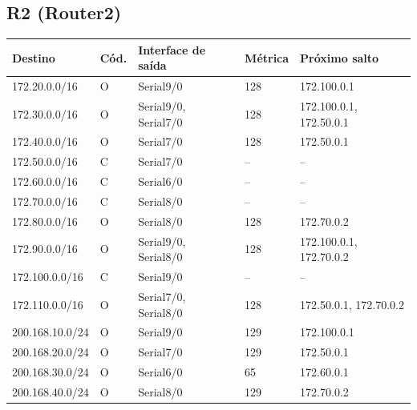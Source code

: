 \subsection*{R2 (Router2)}
\begin{tabular}{@{}llllp{3.6cm}@{}}\toprule Destino & Cód. & Interface de saída & Métrica & Próximo salto\\\midrule
172.20.0.0/16 & O & Serial9/0 & 128 & 172.100.0.1\\
172.30.0.0/16 & O & Serial9/0, Serial7/0 & 128 & 172.100.0.1, 172.50.0.1\\
172.40.0.0/16 & O & Serial7/0 & 128 & 172.50.0.1\\
172.50.0.0/16 & C & Serial7/0 & -- & --\\
172.60.0.0/16 & C & Serial6/0 & -- & --\\
172.70.0.0/16 & C & Serial8/0 & -- & --\\
172.80.0.0/16 & O & Serial8/0 & 128 & 172.70.0.2\\
172.90.0.0/16 & O & Serial9/0, Serial8/0 & 128 & 172.100.0.1, 172.70.0.2\\
172.100.0.0/16 & C & Serial9/0 & -- & --\\
172.110.0.0/16 & O & Serial7/0, Serial8/0 & 128 & 172.50.0.1, 172.70.0.2\\
200.168.10.0/24 & O & Serial9/0 & 129 & 172.100.0.1\\
200.168.20.0/24 & O & Serial7/0 & 129 & 172.50.0.1\\
200.168.30.0/24 & O & Serial6/0 & 65 & 172.60.0.1\\
200.168.40.0/24 & O & Serial8/0 & 129 & 172.70.0.2\\
\bottomrule\end{tabular}

